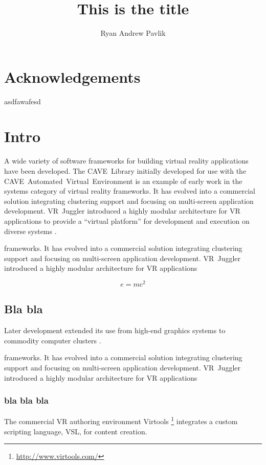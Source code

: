 \documentclass[capstoc,capschap,draftcls]{rpisudiss}
\title{This is the title}
\author{Ryan Andrew Pavlik}
\begin{document}
\maketitle

\tableofcontents{}
\listoffigures
\listoftables

\chapter{Acknowledgements}
asdfawafesd


\mainmatter

\chapter{Intro}


A wide variety of software frameworks for building virtual reality
applications have been developed. The CAVE~Library initially developed
for use with the CAVE~Automated~Virtual~Environment \cite{Cruz-Neira1993}
is an example of early work in the systems category of virtual reality
frameworks. It has evolved into a commercial solution integrating
clustering support and focusing on multi-screen application development.
VR~Juggler introduced a highly modular architecture for VR applications
to provide a ``virtual platform'' for development and execution
on diverse systems \cite{Bierbaum2001,Bierbaum2005}.

frameworks. It has evolved into a commercial solution integrating
clustering support and focusing on multi-screen application development.
VR~Juggler introduced a highly modular architecture for VR applications

\[e=m\mathrm{c}^2\]

\section{Bla bla}
Later development
extended its use from high-end graphics systems to commodity computer
clusters \cite{Allard2002,Bierbaum2005}.


frameworks. It has evolved into a commercial solution integrating
clustering support and focusing on multi-screen application development.
VR~Juggler introduced a highly modular architecture for VR applications

\subsection{bla bla bla}
The commercial
VR authoring environment Virtools%
\footnote{\url{http://www.virtools.com/}%
} integrates a custom scripting language, VSL, for content creation.
\end{document}
